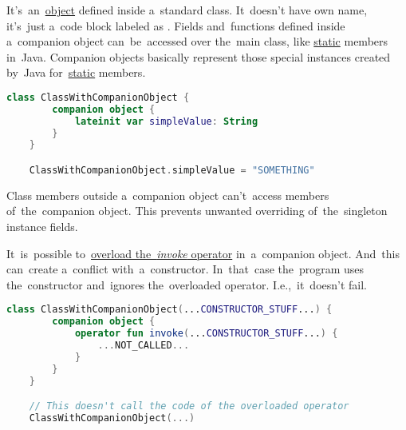 \label{kotlincompanionobject}
It's~an~\hyperref[kotlinobject]{object} defined inside a~standard class.
It~doesn't have own name, it's~just a~code block labeled as .
Fields and~functions defined inside a~companion object can~be~accessed over the~main class, like \hyperref[javastatic]{static} members in~Java.
Companion objects basically represent those special instances created by~Java for~\hyperref[javastatic]{static} members.

\begin{lstlisting}[language=Kotlin]
    class ClassWithCompanionObject {
        companion object {
            lateinit var simpleValue: String
        }
    }

    ClassWithCompanionObject.simpleValue = "SOMETHING"
\end{lstlisting}

\note Class members outside a~companion object can't~access members of~the~companion object.
This prevents unwanted overriding of~the~singleton instance fields.

It~is~possible to~\hyperref[kotlininvokeoverload]{overload \mbox{the \textit{invoke}} operator} in~a~companion object.
And~this can~create a~conflict with~a~constructor.
In~that~case the~program uses the~constructor and~ignores the~overloaded operator.
I.e.,~it~doesn't fail.

\begin{lstlisting}[language=Kotlin]
    class ClassWithCompanionObject(...CONSTRUCTOR_STUFF...) {
        companion object {
            operator fun invoke(...CONSTRUCTOR_STUFF...) {
                ...NOT_CALLED...
            }
        }
    }

    // This doesn't call the code of the overloaded operator
    ClassWithCompanionObject(...)
\end{lstlisting}
\newline

